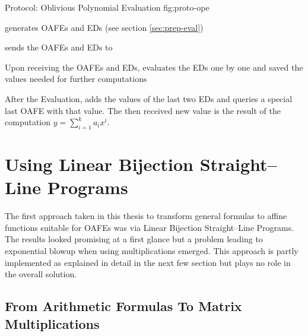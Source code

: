 \documentclass[12pt, a4paper]{article}
\begin{document}
\begin{JWprotocol}%
  {\JWprotoSymOPE}%
  {Protocol: Oblivious Polynomial Evaluation}%
  {fig:proto-ope}


  \begin{JWprotoSteps}

  \item \JWpOne{} generates OAFEs and EDs (see section \ref{sec:prep-eval})

  \item \JWpOne{} sends the OAFEs and EDs to \JWpTwo{}

  \end{JWprotoSteps}



  \begin{JWprotoSteps}

  \item Upon receiving the OAFEs and EDs, \JWpTwo{} evaluates the EDs one by one
    and saved the values needed for further computations

  \item After the Evaluation, \JWpTwo{} adds the values of the last two EDs and
    queries a special last OAFE with that value. The then received new value is
    the result of the computation $y = \sum_{i=1}^k a_ix^i$.

  \end{JWprotoSteps}

\end{JWprotocol}


\section{Using Linear Bijection Straight--Line Programs}
\label{sec:using-lbs}

The first approach taken in this thesis to transform general formulas to affine
functions suitable for OAFEs was via Linear Bijection Straight--Line Programs.
The results looked promising at a first glance but a problem leading to
exponential blowup when using multiplications emerged. This approach is partly
implemented as explained in detail in the next few section but plays no role in
the overall solution.

\subsection{From Arithmetic Formulas To Matrix Multiplications}
\label{sec:FormulasToMatrixMuls}
\end{document}
